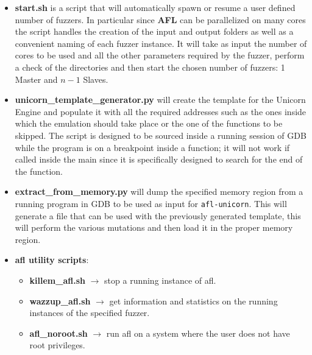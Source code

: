 \documentclass[../main.tex]{subfiles}
\begin{document}
\begin{itemize}

  \item \textbf{start.sh} is a script that will automatically spawn or resume a
  user defined number of fuzzers. In particular since \textbf{AFL} can be
  parallelized on many cores the script handles the creation of the input and
  output folders as well as a convenient naming of each fuzzer instance. It will
  take as input the number of cores to be used and all the other parameters
  required by the fuzzer, perform a check of the directories and then start the
  chosen number of fuzzers: 1 Master and $n-1$ Slaves.

  \item \textbf{unicorn\_template\_generator.py} will create the template for
  the Unicorn Engine and populate it with all the required addresses such as the
  ones inside which the emulation should take place or the one of the functions
  to be skipped. The script is designed to be sourced inside a running session
  of GDB while the program is on a breakpoint inside a function; it will not
  work if called inside the main since it is specifically designed to search for
  the end of the function.

  \item \textbf{extract\_from\_memory.py} will dump the specified memory region
  from a running program in GDB to be used as input for \texttt{afl-unicorn}.
  This will generate a file that can be used with the previously generated
  template, this will perform the various mutations and then  load it in the
  proper memory region.

  \item \textbf{afl utility scripts}:

  \begin{itemize}

    \item \textbf{killem\_afl.sh} $\rightarrow$ stop a running instance of afl.

    \item \textbf{wazzup\_afl.sh} $\rightarrow$  get information and statistics on the running instances of the specified fuzzer.

    \item \textbf{afl\_noroot.sh} $\rightarrow$ run afl on a system where the user does not have root privileges.

  \end{itemize}

\end{itemize}
\end{document}
